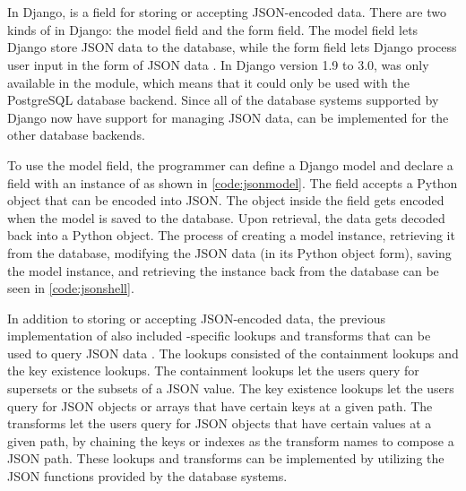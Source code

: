 \section{}

In Django,  is a field for storing or accepting JSON-encoded
data. There are two kinds of  in Django: the model field and
the form field. The model field lets Django store JSON data to the database,
while the form field lets Django process user input in the form of JSON data
\cite{django30_modeljsonfield, django30_formjsonfield}. In Django version
1.9 to 3.0,  was only available in the
 module, which means that it could only be used
with the PostgreSQL database backend. Since all of the database systems
supported by Django now have support for managing JSON data, 
can be implemented for the other database backends.



To use the  model field, the programmer can define a Django
model and declare a field with an instance of  as shown in
\autoref{code:jsonmodel}. The field accepts a Python object that can be encoded
into JSON. The object inside the field gets encoded when the model is saved to
the database. Upon retrieval, the data gets decoded back into a Python object.
The process of creating a model instance, retrieving it from the database,
modifying the JSON data (in its Python object form), saving the model instance,
and retrieving the instance back from the database can be seen in
\autoref{code:jsonshell}.

\noindent
\begin{minipage}{\linewidth}

\end{minipage}

In addition to storing or accepting JSON-encoded data, the previous
implementation of  also included -specific
lookups and transforms that can be used to query JSON data
\cite{django30_modeljsonfield}. The lookups consisted of the containment
lookups and the key existence lookups. The containment lookups let the users
query for supersets or the subsets of a JSON value. The key existence lookups
let the users query for JSON objects or arrays that have certain keys at a
given path. The transforms let the users query for JSON objects that have
certain values at a given path, by chaining the keys or indexes as the
transform names to compose a JSON path. These lookups and transforms can be
implemented by utilizing the JSON functions provided by the database systems.

